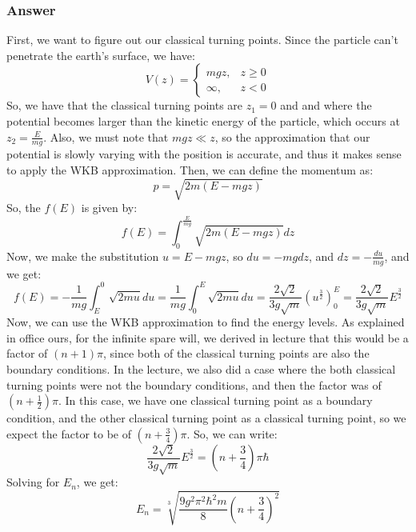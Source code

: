 \documentclass{article}[16pt]
\begin{document}
\subsubsection{Answer}
First, we want to figure out our classical turning points. Since the particle can't penetrate the earth's surface, we have:
\begin{equation}
    V(z) =
\begin{cases}
    mgz, & z \geq 0 \\
    \infty, & z < 0
\end{cases}
\end{equation}
So, we have that the classical turning points are $z_1 = 0$ and and where the potential becomes larger than the kinetic energy of the particle, which occurs at $z_2 = \frac{E}{mg}$.
Also, we must note that $mgz \ll z$, so the approximation that our potential is slowly varying with the position is accurate, and thus it makes sense to apply the WKB approximation.
Then, we can define the momentum as:
\begin{equation}
    p = \sqrt{2m(E - mgz)}
\end{equation}
So, the $f(E)$ is given by:
\begin{equation}
    f(E) = \int_{0}^{\frac{E}{mg}} \sqrt{2m(E - mgz)} dz
\end{equation}
Now, we make the substitution $u = E-mgz$, so $du = -mgdz$, and $dz = -\frac{du}{mg}$, and we get:
\begin{equation}
    f(E) = -\frac{1}{mg} \int_{E}^{0} \sqrt{2mu} du = \frac{1}{mg} \int_{0}^{E} \sqrt{2mu} du = \frac{2\sqrt{2}}{3g\sqrt{m}} (u^{\frac{3}{2}})_{0}^{E} = \frac{2\sqrt{2}}{3g\sqrt{m}} E^{\frac{3}{2}}
\end{equation}
Now, we can use the WKB approximation to find the energy levels. As explained in office ours, for the infinite spare will, we derived in lecture that this would be a factor of $(n+1)\pi$, since both of the classical turning points are also the boundary conditions. In the lecture, we also did a case where the both classical turning points were not the boundary conditions, and then the factor was of $(n+\frac{1}{2})\pi$. In this case, we have one classical turning point as a boundary condition, and the other classical turning point as a classical turning point, so we expect the factor to be of $(n+\frac{3}{4})\pi$. So, we can write:
\begin{equation}
    \frac{2\sqrt{2}}{3g\sqrt{m}} E^{\frac{3}{2}} = (n + \frac{3}{4})\pi\hbar
\end{equation}
Solving for $E_n$, we get:
\begin{equation}
    E_n = \sqrt[3]{\frac{9g^2\pi^2 \hbar^2m}{8} (n + \frac{3}{4})^2}
\end{equation}
\end{document}
